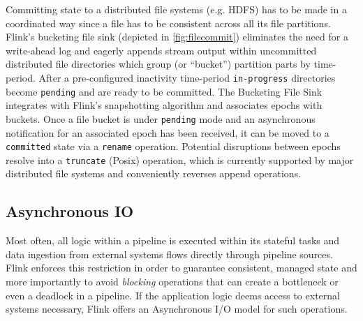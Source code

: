  Committing state to a distributed file systems (e.g. HDFS) has to be made in a coordinated way since a file has to be consistent across all its file partitions. Flink's bucketing file sink (depicted in \autoref{fig:filecommit}) eliminates the need for a write-ahead log and eagerly appends stream output within uncommitted distributed file directories which group (or ``bucket'') partition parts by time-period. After a pre-configured inactivity time-period \texttt{in-progress} directories become \texttt{pending} and are ready to be committed. The Bucketing File Sink integrates with Flink's snapshotting algorithm and associates epochs with buckets. Once a file bucket is under \texttt{pending} mode and an asynchronous notification for an associated epoch has been received, it can be moved to a \texttt{committed} state via a \texttt{rename} operation. Potential disruptions between epochs resolve into a \texttt{truncate} (Posix) operation, which is currently supported by major distributed file systems and conveniently reverses append operations. 

\subsection{Asynchronous IO}
Most often, all logic within a pipeline is executed within its stateful tasks and data ingestion from external systems flows directly through pipeline sources. Flink enforces this restriction in order to guarantee consistent, managed state and more importantly to avoid \emph{blocking} operations that can create a bottleneck or even a deadlock in a pipeline. If the application logic deems access to external systems necessary, Flink offers an Asynchronous I/O model for such operations. 

